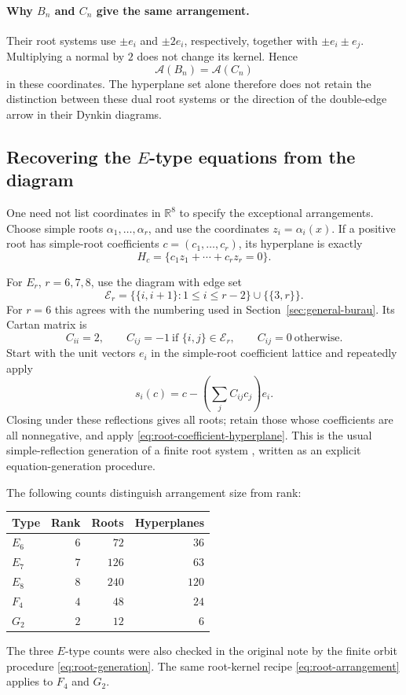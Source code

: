 \documentclass[11pt,a4paper]{article}
\theoremstyle{remark}\newtheorem{remark}[theorem]{Remark}
\newcommand{\A}{\mathcal A}
\begin{document}
\paragraph{Why $B_n$ and $C_n$ give the same arrangement.}
Their root systems use $\pm e_i$ and $\pm2e_i$, respectively, together
with $\pm e_i\pm e_j$.  Multiplying a normal by $2$ does not change
its kernel.  Hence
\[
\A(B_n)=\A(C_n)
\]
in these coordinates.  The hyperplane set alone therefore does not
retain the distinction between these dual root systems or the direction
of the double-edge arrow in their Dynkin diagrams.

\subsection*{Recovering the $E$-type equations from the diagram}
One need not list coordinates in $\mathbb R^8$ to specify the exceptional
arrangements.  Choose simple roots $\alpha_1,\ldots,\alpha_r$, and use
the coordinates $z_i=\alpha_i(x)$.  If a positive root has simple-root
coefficients $c=(c_1,\ldots,c_r)$, its hyperplane is exactly
\begin{equation}\label{eq:root-coefficient-hyperplane}
H_c=\{c_1z_1+\cdots+c_rz_r=0\}.
\end{equation}

For $E_r$, $r=6,7,8$, use the diagram with edge set
\[
\mathcal E_r=\{\{i,i+1\}:1\le i\le r-2\}\cup\{\{3,r\}\}.
\]
For $r=6$ this agrees with the numbering used in
Section~\ref{sec:general-burau}.  Its Cartan matrix is
\[
C_{ii}=2,\qquad C_{ij}=-1\ \text{if }\{i,j\}\in\mathcal E_r,
\qquad C_{ij}=0\ \text{otherwise}.
\]
Start with the unit vectors $e_i$ in the simple-root coefficient lattice
and repeatedly apply
\begin{equation}\label{eq:root-generation}
s_i(c)=c-\left(\sum_j C_{ij}c_j\right)e_i.
\end{equation}
Closing under these reflections gives all roots; retain those whose
coefficients are all nonnegative, and apply
\eqref{eq:root-coefficient-hyperplane}.  This is the usual simple-reflection
generation of a finite root system \cite[\S\S21--23]{Etingof}, written
as an explicit equation-generation procedure.

The following counts distinguish arrangement size from rank:
\begin{center}
\begin{tabular}{lrrr}
\toprule
Type & Rank & Roots & Hyperplanes\\
\midrule
$E_6$ & $6$ & $72$ & $36$\\
$E_7$ & $7$ & $126$ & $63$\\
$E_8$ & $8$ & $240$ & $120$\\
$F_4$ & $4$ & $48$ & $24$\\
$G_2$ & $2$ & $12$ & $6$\\
\bottomrule
\end{tabular}
\end{center}
The three $E$-type counts were also checked in the original note by the finite orbit procedure
\eqref{eq:root-generation}.  The same root-kernel recipe
\eqref{eq:root-arrangement} applies to $F_4$ and $G_2$.
\end{document}
